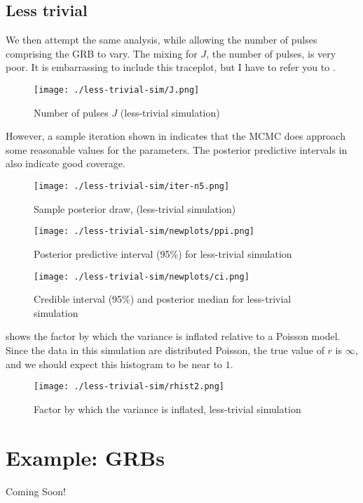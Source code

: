 \documentclass[12pt,letterpaper]{article}
\begin{document}

\subsection{Less trivial}
We then attempt the same analysis, while allowing the number of pulses comprising the GRB to vary.  The mixing for $J$, the number of pulses, is very poor. It is embarrassing to include this traceplot, but I have to refer you to . 

\begin{figure}
 \centering
\texttt{[image: ./less-trivial-sim/J.png]}
\caption{Number of pulses $J$ (less-trivial simulation)}
 \label{f:ltriv-J}
\end{figure}

However, a sample iteration shown in  indicates that the MCMC does approach some reasonable values for the parameters. The posterior predictive intervals in  also indicate good coverage.


\begin{figure}
 \centering
\texttt{[image: ./less-trivial-sim/iter-n5.png]}
\caption{Sample posterior draw,  (less-trivial simulation)}
 \label{f:ltriv-iter}
\end{figure}


\begin{figure}
 \centering
\texttt{[image: ./less-trivial-sim/newplots/ppi.png]}
\caption{Posterior predictive interval (95\%) for less-trivial simulation}
 \label{f:ltriv-ppi}
\end{figure}

\begin{figure}
 \centering
\texttt{[image: ./less-trivial-sim/newplots/ci.png]}
\caption{Credible interval (95\%) and posterior median for less-trivial simulation}
 \label{f:ltriv-ci}
\end{figure}


 shows the factor by which the variance is inflated relative to a Poisson model.  Since the data in this simulation are distributed Poisson, the true value of $r$ is $\infty$, and we should expect this histogram to be near to $1$. 

\begin{figure}
 \centering
\texttt{[image: ./less-trivial-sim/rhist2.png]}
\caption{Factor by which the variance is inflated, less-trivial simulation}
 \label{f:ltriv-r}
\end{figure}

\section{Example: GRBs}
Coming Soon!

\normalbaselines %

\end{document}
